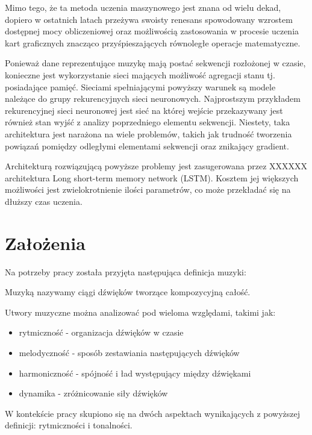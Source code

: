 {{    Mimo tego, że ta metoda uczenia maszynowego jest znana od wielu dekad, dopiero w ostatnich latach
    przeżywa swoisty renesans spowodowany wzrostem dostępnej mocy obliczeniowej oraz 
    możliwością zastosowania w procesie uczenia kart graficznych znacząco 
    przyśpieszających równoległe operacje matematyczne.


    Ponieważ dane reprezentujące muzykę mają postać sekwencji rozłożonej w czasie, 
    konieczne jest wykorzystanie sieci mających możliwość agregacji stanu tj. posiadające pamięć.
    Sieciami spełniającymi powyższy warunek są modele należące do grupy rekurencyjnych sieci neuronowych.
    Najprostszym przykładem rekurencyjnej sieci neuronowej jest sieć na której wejście 
    przekazywany jest również stan wyjść z analizy poprzedniego elementu sekwencji.
    Niestety, taka architektura jest narażona na wiele problemów, takich jak trudność
    tworzenia powiązań pomiędzy odległymi elementami sekwencji oraz znikający gradient.

    Architekturą rozwiązującą powyższe problemy jest zasugerowana przez XXXXXX architektura
    Long short-term memory network (LSTM). Kosztem jej większych możliwości jest zwielokrotnienie 
    ilości parametrów, co może przekładać się na dłuższy czas uczenia.
  }

  \section{Założenia}
  {
    Na potrzeby pracy została przyjęta następująca definicja muzyki:

    Muzyką nazywamy ciągi dźwięków tworzące kompozycyjną całość. 

    Utwory muzyczne można analizować pod wieloma względami, takimi jak:
    \begin{itemize}
        \item rytmiczność - organizacja dźwięków w czasie
        \item melodyczność - sposób zestawiania następujących dźwięków 
        \item harmoniczność - spójność i ład występujący między dźwiękami
        \item dynamika - zróżnicowanie siły dźwięków
    \end{itemize}

    W kontekście pracy skupiono się na dwóch aspektach wynikających z powyższej 
    definicji: rytmiczności i tonalności.
  }

}
